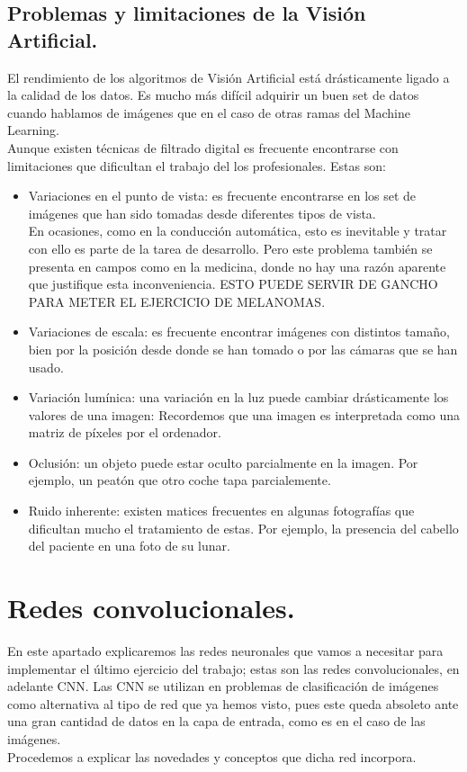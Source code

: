 \documentclass[a4paper,10pt]{article}
\begin{document}
\subsection{Problemas y limitaciones de la Visión Artificial.}
El rendimiento de los algoritmos de Visión Artificial está drásticamente ligado a la calidad de los datos. Es mucho más difícil adquirir un buen set de datos cuando hablamos de imágenes que en el caso de otras ramas del Machine Learning.
\\Aunque existen técnicas de filtrado digital es frecuente encontrarse con limitaciones que dificultan el trabajo del los profesionales. Estas son:
\begin{itemize}
\item Variaciones en el punto de vista: es frecuente encontrarse en los set de imágenes que han sido tomadas desde diferentes tipos de vista. \\En ocasiones, como en la conducción automática, esto es inevitable y tratar con ello es parte de la tarea de desarrollo. Pero este problema también se presenta en campos como en la medicina, donde no hay una razón aparente que justifique esta inconveniencia. ESTO PUEDE SERVIR DE GANCHO PARA METER EL EJERCICIO DE MELANOMAS.
\item Variaciones de escala: es frecuente encontrar imágenes con distintos tamaño, bien por la posición desde donde se han tomado o por las cámaras que se han usado.
\item Variación lumínica: una variación en la luz puede cambiar drásticamente los valores de una imagen: Recordemos que una imagen es interpretada como una matriz de píxeles por el ordenador.
\item Oclusión:  un objeto puede estar oculto parcialmente en la imagen. Por ejemplo, un peatón que otro coche tapa parcialemente.
\item Ruido inherente: existen matices frecuentes en algunas fotografías que dificultan mucho el tratamiento de estas. Por ejemplo, la presencia del cabello del paciente en una foto de su lunar.

\end{itemize}



\newpage
\section{Redes convolucionales.}
En este apartado explicaremos las redes neuronales que vamos a necesitar para implementar el último ejercicio del trabajo; estas son las redes convolucionales, en adelante CNN. Las CNN se utilizan en problemas de clasificación de imágenes como alternativa al tipo de red que ya hemos visto, pues este queda absoleto ante una gran cantidad de datos en la capa de entrada, como es en el caso de las imágenes.\\ Procedemos a explicar las novedades y conceptos que dicha red incorpora.\\
\end{document}
